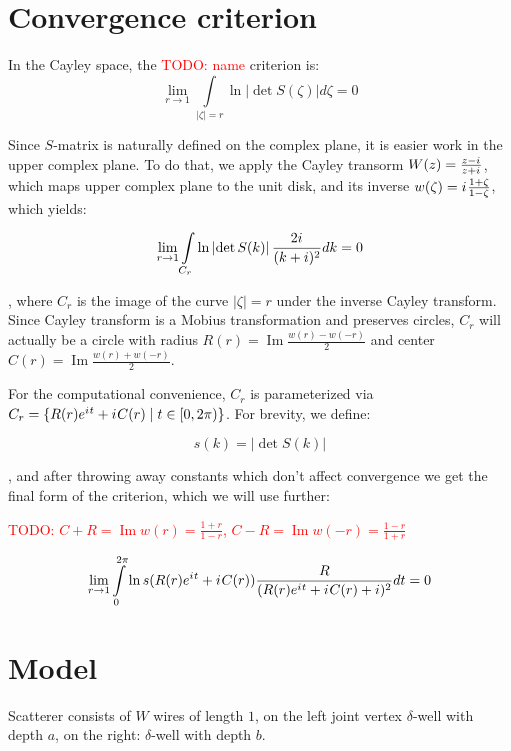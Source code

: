 \documentclass[12pt, a4paper]{article}
\newcommand{\abs}[1]{\left| #1 \right|}
\newcommand{\eexp}[1]{e^{#1}}
\newcommand{\iu}{{i\mkern1mu}}
\renewcommand{\Im}{\operatorname{Im}}
\newcommand{\todo}[1]{{\large \textcolor{red}{TODO: #1}}}
\begin{document}
\section{Convergence criterion}

In the Cayley space, the \todo{name} criterion is:
\[
\lim\limits_{r \to 1} \int\limits_{\abs{\zeta} = r} \ln \abs{\det S(\zeta)} d\zeta = 0
\]

Since $S$-matrix is naturally defined on the complex plane, it is easier work in the upper complex plane. To do that, we apply the Cayley transorm $W(z) = \frac{z - \iu}{z + \iu}$, which maps upper complex plane to the unit disk, and its inverse $w(\zeta) = \iu \frac{1 + \zeta}{1 - \zeta}$, which yields:

\begin{equation}\label{crit}
\lim\limits_{r \to 1} \int\limits_{C_r} \ln \abs{\det S(k)} \frac{2 \iu}{(k + i)^2} dk = 0
\end{equation}

, where $C_r$ is the image of the curve $\abs{\zeta} = r$ under the inverse Cayley transform. Since Cayley transform is a Mobius transformation and preserves circles, $C_r$ will actually be a circle with radius $R(r) = \Im \frac{w(r) - w(-r)}{2}$ and center $C(r) = \Im \frac{w(r) + w(-r)}{2}$.

For the computational convenience, $C_r$ is parameterized via $C_r = \{R(r) \eexp{\iu t} + \iu C(r) \mid t \in [0, 2 \pi)\}$. For brevity, we define:

\[
s(k) = \abs{\det S(k)}
\]

, and after throwing away constants which don't affect convergence we get the final form of the criterion, which we will use further:

\todo{$C + R = \Im w(r) = \frac{1 + r}{1 - r}$, $C - R = \Im w(-r) = \frac{1 - r}{1 + r}$}

\begin{equation}\label{critp}
\lim\limits_{r \to 1} \int\limits_{0}^{2 \pi} \ln s(R(r) \eexp{\iu t} + \iu C(r)) \frac{R}{(R(r) \eexp{\iu t} + \iu C(r) + i)^2} dt = 0
\end{equation}

\section{Model}

Scatterer consists of $W$ wires of length $1$, on the left joint vertex $\delta$-well with depth $a$, on the right: $\delta$-well with depth $b$. 
\end{document}
